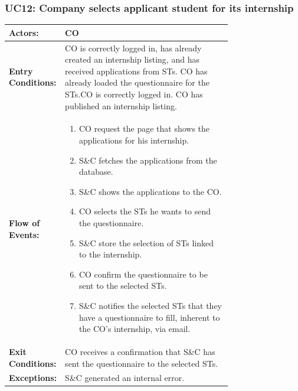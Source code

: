 
\subsubsection{UC12: Company selects applicant student for its internship}
\label{subsubsec:company-select-applicant-student-for-its-internship}

\begin{center}
    \begin{longtable}{|l|p{0.75\linewidth}|}
        \hline
        \textbf{Actors:}           & CO                                                                                                                      \\
        \hline
        \textbf{Entry Conditions:} & CO is correctly logged in, has already created an internship listing, and has received applications from STs.
        CO has already loaded the questionnaire for the STs.CO is correctly logged in. CO has published an internship listing.                               \\
        \hline
        \textbf{Flow of Events:}   & \begin{enumerate}
                                         \item CO request the page that shows the applications for his internship.
                                         \item S\&C fetches the applications from the database.
                                         \item S\&C shows the applications to the CO.
                                         \item CO selects the STs he wants to send the questionnaire.
                                         \item S\&C store the selection of STs linked to the internship.
                                         \item CO confirm the questionnaire to be sent to the selected STs.
                                         \item S\&C notifies the selected STs that they have a questionnaire to fill, inherent to the CO's internship, via email.
                                     \end{enumerate} \\
        \hline
        \textbf{Exit Conditions:}  & CO receives a confirmation that S\&C has sent the questionnaire to the selected STs.                                    \\
        \hline
        \textbf{Exceptions:}       & S\&C generated an internal error.                                                                                       \\
        \hline
    \end{longtable}
\end{center}

